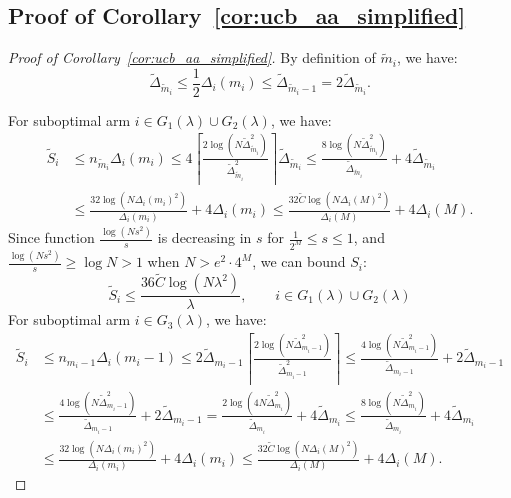 \documentclass[
  12pt]{article}
\begin{document}
\subsection{Proof of Corollary~\ref{cor:ucb_aa_simplified}}
\label{sec:Proof of cor:ucb_aa_simplified}
\begin{proof}[Proof of Corollary~\ref{cor:ucb_aa_simplified}]
By definition of $\tilde{m}_i$, we have:
\[  \tilde{\Delta}_{\tilde{m}_i} \leq \frac{1}{2}\Delta_i(m_i)\leq \tilde{\Delta}_{\tilde{m}_i-1}=2 \tilde{\Delta}_{\tilde{m}_i}.\]


For suboptimal arm $i\in G_1(\lambda)\cup G_2(\lambda)$, we have:
\begin{align*}
   \tilde{S}_i &\leq n_{\tilde{m}_i}\Delta_i(m_i)\leq 
4 \left\lceil \frac{2\log(N \tilde{\Delta}_{\tilde{m}_i}^2)}{\tilde{\Delta}_{\tilde{m}_i}^2} \right\rceil \tilde{\Delta}_{\tilde{m}_i} \leq \frac{8\log(N \tilde{\Delta}_{\tilde{m}_i}^2)}{\tilde{\Delta}_{\tilde{m}_i}} +4\tilde{\Delta}_{\tilde{m}_i} \\
& \le \frac{32\log(N \Delta_i(m_i)^2)}{\Delta_i(m_i)} +4\Delta_i(m_i)
\le  \frac{32 \tilde{C}\log(N \Delta_i(M)^2)}{\Delta_i(M)} +4\Delta_i(M).
\end{align*}
Since function $\frac{\log (Ns^2)}{s}$ is decreasing in $s$ for $\frac{1}{2^M}\leq s\leq 1$, and $\frac{\log (Ns^2)}{s}\geq \log N>1$ when $N>e^2\cdot4^M$, we can bound $S_i$:
$$\tilde{S}_i\leq  \frac{36\tilde{C}\log(N \lambda^2)}{\lambda} , \quad \quad  i\in G_1(\lambda)\cup G_2(\lambda)$$
For suboptimal arm $i\in G_3(\lambda)$, we have:
\begin{align*}
     \tilde{S}_i &\leq n_{m_i-1}\Delta_i(m_i-1)\leq 2\tilde{\Delta}_{m_i-1} \left\lceil \frac{2\log(N \tilde{\Delta}_{m_i-1}^2)}{\tilde{\Delta}_{m_i-1}^2} \right\rceil  \leq \frac{4\log(N \tilde{\Delta}_{m_i-1}^2)}{\tilde{\Delta}_{m_i-1}}+2\tilde{\Delta}_{m_i-1} \\
     &\le \frac{4\log(N \tilde{\Delta}_{m_i-1}^2)}{\tilde{\Delta}_{m_i-1}}+2\tilde{\Delta}_{m_i-1}
     = \frac{2\log(4N \tilde{\Delta}_{m_i}^2)}{\tilde{\Delta}_{m_i}}+4\tilde{\Delta}_{m_i} 
     \le \frac{8\log(N \tilde{\Delta}_{m_i}^2)}{\tilde{\Delta}_{m_i}}+4\tilde{\Delta}_{m_i}\\ 
     &\le \frac{32\log(N \Delta_i(m_i)^2)}{\Delta_i(m_i)} +4\Delta_i(m_i)
\le  \frac{32 \tilde{C}\log(N \Delta_i(M)^2)}{\Delta_i(M)} +4\Delta_i(M).
\end{align*}


\end{proof}
\end{document}

